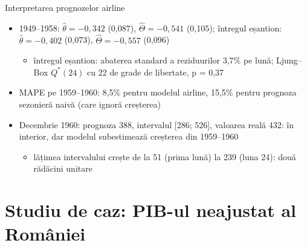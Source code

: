 \begin{frame}{Interpretarea prognozelor airline}
\itemsize{\footnotesize}
\begin{itemize}
    \item 1949--1958: $\hat\theta = \ensuremath{-}0{,}342$ (0{,}087), $\hat\Theta = \ensuremath{-}0{,}541$ (0{,}105); întregul eșantion: $\hat\theta = \ensuremath{-}0{,}402$ (0{,}073), $\hat\Theta = \ensuremath{-}0{,}557$ (0{,}096)
    \begin{itemize}
        \item întregul eșantion: abaterea standard a reziduurilor 3{,}7\% pe lună; Ljung--Box $Q^*(24)$ cu 22 de grade de libertate, p = 0{,}37
    \end{itemize}
    \item MAPE pe 1959--1960: 8{,}5\% pentru modelul airline, 15{,}5\% pentru prognoza sezonieră naivă (care ignoră creșterea)
    \item Decembrie 1960: prognoza 388, intervalul [286; 526], valoarea reală 432: în interior, dar modelul subestimează creșterea din 1959--1960
    \begin{itemize}
        \item lățimea intervalului crește de la 51 (prima lună) la 239 (luna 24): două rădăcini unitare
    \end{itemize}
\end{itemize}
\end{frame}


\section{Studiu de caz: PIB-ul neajustat al României}

